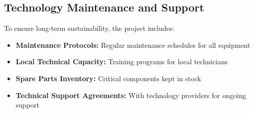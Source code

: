 \subsection{Technology Maintenance and Support}

To ensure long-term sustainability, the project includes:

\begin{itemize}
    \item \textbf{Maintenance Protocols:} Regular maintenance schedules for all equipment
    \item \textbf{Local Technical Capacity:} Training programs for local technicians
    \item \textbf{Spare Parts Inventory:} Critical components kept in stock
    \item \textbf{Technical Support Agreements:} With technology providers for ongoing support
\end{itemize} 